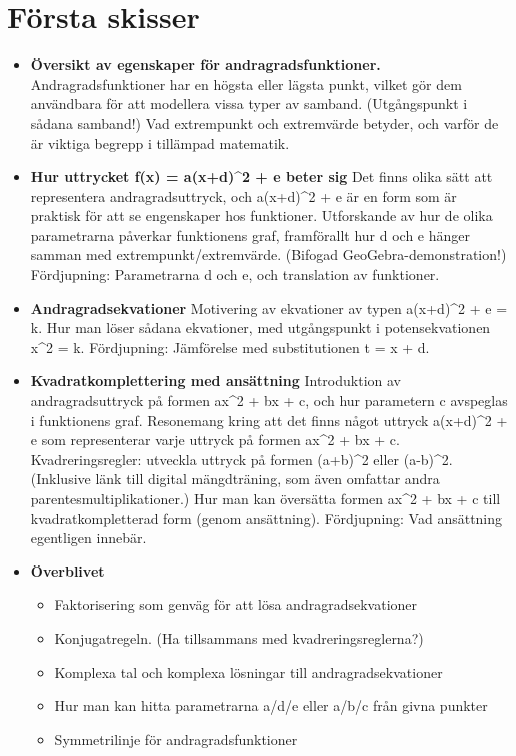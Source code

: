 \documentclass[12pt]{article}
\begin{document}
  \section{Första skisser}
  \begin{itemize}

  \item \textbf{Översikt av egenskaper för andragradsfunktioner.}
  Andragradsfunktioner har en högsta eller lägsta punkt, vilket gör dem användbara för att modellera vissa typer av samband.
  (Utgångspunkt i sådana samband!)
  Vad extrempunkt och extremvärde betyder, och varför de är viktiga begrepp i tillämpad matematik.

  \item \textbf{Hur uttrycket f(x) = a(x+d)^2 + e beter sig}
  Det finns olika sätt att representera andragradsuttryck, och a(x+d)^2 + e är en form som är praktisk för att se engenskaper hos funktioner.
  Utforskande av hur de olika parametrarna påverkar funktionens graf, framförallt hur d och e hänger samman med extrempunkt/extremvärde.
  (Bifogad GeoGebra-demonstration!)
  Fördjupning: Parametrarna d och e, och translation av funktioner.
  
  \item \textbf{Andragradsekvationer}
  Motivering av ekvationer av typen a(x+d)^2 + e = k.
  Hur man löser sådana ekvationer, med utgångspunkt i potensekvationen x^2 = k.
  Fördjupning: Jämförelse med substitutionen t = x + d.

  \item \textbf{Kvadratkomplettering med ansättning}
  Introduktion av andragradsuttryck på formen ax^2 + bx + c, och hur parametern c avspeglas i funktionens graf.
  Resonemang kring att det finns något uttryck a(x+d)^2 + e som representerar varje uttryck på formen ax^2 + bx + c.
  Kvadreringsregler: utveckla uttryck på formen (a+b)^2 eller (a-b)^2.
  (Inklusive länk till digital mängdträning, som även omfattar andra parentesmultiplikationer.)
  Hur man kan översätta formen ax^2 + bx + c till kvadratkompletterad form (genom ansättning).
  Fördjupning: Vad ansättning egentligen innebär.
  
  \item \textbf{Överblivet}
  \begin{itemize}
    \item Faktorisering som genväg för att lösa andragradsekvationer
    \item Konjugatregeln. (Ha tillsammans med kvadreringsreglerna?)
    \item Komplexa tal och komplexa lösningar till andragradsekvationer
    \item Hur man kan hitta parametrarna a/d/e eller a/b/c från givna punkter
    \item Symmetrilinje för andragradsfunktioner
  \end{itemize}

  \end{itemize}
\end{document}
